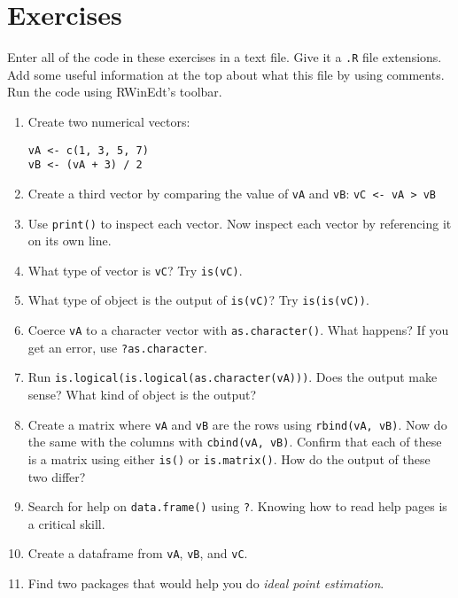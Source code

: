 \section{Exercises}
Enter all of the code in these exercises in a text file. Give it a
\texttt{.R} file extensions. Add some useful information at the top
about what this file by using comments. Run the code using RWinEdt's toolbar.

\begin{enumerate}
\item Create two numerical vectors:
\begin{verbatim}
vA <- c(1, 3, 5, 7)
vB <- (vA + 3) / 2
\end{verbatim}

\item Create a third vector by comparing the value of \texttt{vA} and \texttt{vB}:
\verb=vC <- vA > vB=

\item Use \texttt{print()} to inspect each vector. Now inspect each
  vector by referencing it on its own line.

\item What type of vector is \texttt{vC}? Try \texttt{is(vC)}.

\item What type of object is the output of \texttt{is(vC)}? Try \texttt{is(is(vC))}.

\item Coerce \texttt{vA} to a character vector with
  \texttt{as.character()}. What happens? If you get an error, use
  \texttt{?as.character}.

\item Run \verb=is.logical(is.logical(as.character(vA)))=. Does the
  output make sense? What kind of object is the output?

\item Create a matrix where \texttt{vA} and \texttt{vB} are the rows
  using \verb=rbind(vA, vB)=. Now do the same with the columns with
  \verb=cbind(vA, vB)=. Confirm that each of these is a matrix using
  either \texttt{is()} or \texttt{is.matrix()}. How do the output of
  these two differ?

\item Search for help on \texttt{data.frame()} using
  \texttt{?}. Knowing how to read \R{} help pages is a critical skill.

\item Create a dataframe from \texttt{vA}, \texttt{vB}, and \texttt{vC}.

\item Find two \R{} packages that would help you do \textit{ideal
    point estimation}.

\end{enumerate}

